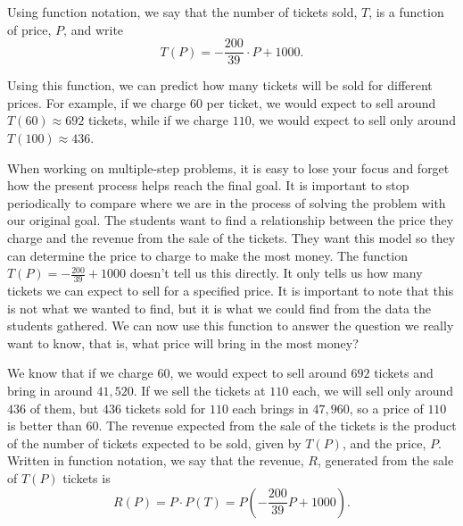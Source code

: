 \documentclass[10pt,]{book}
\theoremstyle{ptxdefinitionnotitle}
\theoremstyle{ptxdefinitiontitle}
\numberwithin{equation}{section}
\begin{document}
%
\par
\hypertarget{p-25}{}%
Using function notation, we say that the number of tickets sold, \(T\), is a function of price, \(P\), and write%
\begin{equation*}
T \left(P \right) = - \frac{200}{39} \cdot P + 1000\text{.}
\end{equation*}
%
\par
\hypertarget{p-26}{}%
Using this function, we can predict how many tickets will be sold for different prices. For example, if we charge \textdollar{}\(60\) per ticket, we would expect to sell around \(T\left(60 \right) \approx 692\) tickets, while if we charge \textdollar{}\(110\), we would expect to sell only around \(T\left(100 \right) \approx 436\).%
\par
\hypertarget{p-27}{}%
When working on multiple-step problems, it is easy to lose your focus and forget how the present process helps reach the final goal. It is important to stop periodically to compare where we are in the process of solving the problem with our original goal. The students want to find a relationship between the price they charge and the revenue from the sale of the tickets. They want this model so they can determine the price to charge to make the most money. The function \(T \left( P \right) = - \frac{200}{39} + 1000\) doesn’t tell us this directly. It only tells us how many tickets we can expect to sell for a specified price. It is important to note that this is not what we wanted to find, but it is what we could find from the data the students gathered. We can now use this function to answer the question we really want to know, that is, what price will bring in the most money?%
\par
\hypertarget{p-28}{}%
We know that if we charge \textdollar{}\(60\), we would expect to sell around \(692\) tickets and bring in around \textdollar{}\(41,520\). If we sell the tickets at \textdollar{}\(110\) each, we will sell only around \(436\) of them, but \(436\) tickets sold for \textdollar{}\(110\) each brings in \textdollar{}\(47,960\), so a price of \textdollar{}\(110\) is better than \textdollar{}\(60\). The revenue expected from the sale of the tickets is the product of the number of tickets expected to be sold, given by \(T \left(P \right)\), and the price, \(P\). Written in function notation, we say that the revenue, \(R\), generated from the sale of \(T \left(P \right)\) tickets is%
\begin{equation*}
R \left(P \right) = P \cdot P \left( T \right) = P \left( - \frac{200}{39}P + 1000 \right)\text{.}
\end{equation*}
\end{document}
